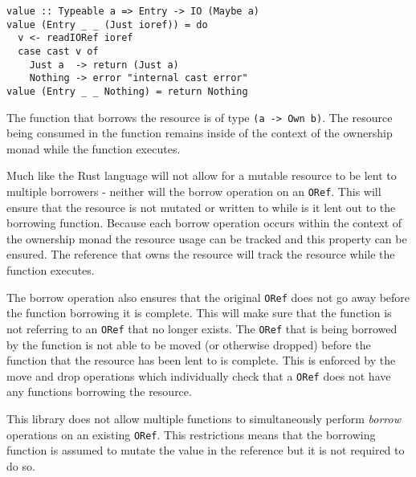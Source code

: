 \documentclass[onehalf,11pt]{beavtex}
\begin{document}
\begin{verbatim}
value :: Typeable a => Entry -> IO (Maybe a)
value (Entry _ _ (Just ioref)) = do
  v <- readIORef ioref
  case cast v of
    Just a  -> return (Just a)
    Nothing -> error "internal cast error"
value (Entry _ _ Nothing) = return Nothing
\end{verbatim}

The function that borrows the resource is of type \texttt{(a -> Own b)}. The
resource being consumed in the function remains inside of the context of the
ownership monad while the function executes. %

Much like the Rust language will not allow for a mutable resource to be lent to
multiple borrowers - neither will the borrow operation on an \texttt{ORef}.
This will ensure that the resource is not mutated or written to while is it lent
out to the borrowing function.
Because each borrow operation occurs within the context of the ownership monad
the resource usage can be tracked and this property can be ensured. The
reference that owns the resource will track the resource while the function
executes.

The borrow operation also ensures that the original \texttt{ORef} does not
go away before the function borrowing it is complete. This will make sure that
the function is not referring to an \texttt{ORef} that no longer exists.
The \texttt{ORef} that is being borrowed by the function is not able to be moved
(or otherwise dropped) before the function that the resource has been lent to is
complete. This is enforced by the move and drop operations which individually
check that a \texttt{ORef} does not have any functions borrowing the resource.

This library does not allow multiple functions to simultaneously perform
\textit{borrow} operations on an existing \texttt{ORef}.
This restrictions means that the borrowing function is assumed to mutate the
value in the reference but it is not required to do so.



\end{document}
